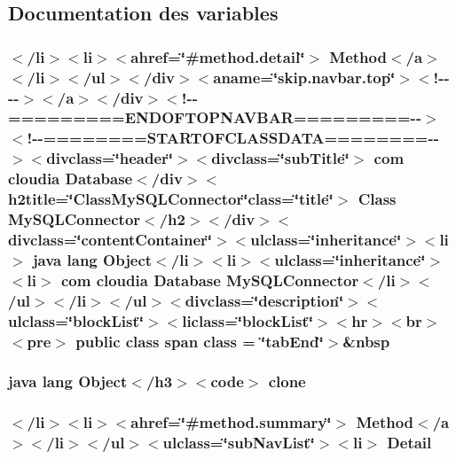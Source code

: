 \subsection{Documentation des variables}
\hypertarget{_my_s_q_l_connector_8html_a6073286361c565bca36f85919cc05c30}{
\subsubsection[{class}]{\setlength{\rightskip}{0pt plus 5cm}$<$/li$>$$<$li$>$$<$ahref=\char`\"{}\#method.\-detail\char`\"{}$>$ Method$<$/{\bf a}$>$$<$/li$>$$<$/ul$>$$<$/div$>$$<$aname=\char`\"{}skip.\-navbar.\-top\char`\"{}$>$$<$!-\/-\/-\/-\/$>$$<$/a$>$$<$/div$>$$<$!-\/-\/=========E\-N\-D\-O\-F\-T\-O\-P\-N\-A\-V\-B\-A\-R=========-\/-\/$>$$<$!-\/-\/========S\-T\-A\-R\-T\-O\-F\-C\-L\-A\-S\-S\-D\-A\-T\-A========-\/-\/$>$$<$divclass=\char`\"{}header\char`\"{}$>$$<$divclass=\char`\"{}sub\-Title\char`\"{}$>$ com cloudia Database$<$/div$>$$<$h2title=\char`\"{}Class\-My\-S\-Q\-L\-Connector\char`\"{}class=\char`\"{}title\char`\"{}$>$ Class {\bf My\-S\-Q\-L\-Connector}$<$/h2$>$$<$/div$>$$<$divclass=\char`\"{}content\-Container\char`\"{}$>$$<$ulclass=\char`\"{}inheritance\char`\"{}$>$$<$li$>$ java lang Object$<$/li$>$$<$li$>$$<$ulclass=\char`\"{}inheritance\char`\"{}$>$$<$li$>$ com cloudia Database {\bf My\-S\-Q\-L\-Connector}$<$/li$>$$<$/ul$>$$<$/li$>$$<$/ul$>$$<$divclass=\char`\"{}description\char`\"{}$>$$<$ulclass=\char`\"{}block\-List\char`\"{}$>$$<$liclass=\char`\"{}block\-List\char`\"{}$>$$<$hr$>$$<$br$>$$<$pre$>$ public class {\bf span} class = \char`\"{}tab\-End\char`\"{}$>$\&nbsp}}\label{_my_s_q_l_connector_8html_a6073286361c565bca36f85919cc05c30}
\hypertarget{_my_s_q_l_connector_8html_adc9607fcabf6f2d7f401ad52015ef6e0}{
\subsubsection[{clone}]{\setlength{\rightskip}{0pt plus 5cm}java lang Object$<$/h3$>$$<$code$>$ clone}}\label{_my_s_q_l_connector_8html_adc9607fcabf6f2d7f401ad52015ef6e0}
\hypertarget{_my_s_q_l_connector_8html_a1e04b5ec07bcd5281e26dcd40e5b3a94}{
\subsubsection[{Detail}]{\setlength{\rightskip}{0pt plus 5cm}$<$/li$>$$<$li$>$$<$ahref=\char`\"{}\#method.\-summary\char`\"{}$>$ Method$<$/{\bf a}$>$$<$/li$>$$<$/ul$>$$<$ulclass=\char`\"{}sub\-Nav\-List\char`\"{}$>$$<$li$>$ Detail}}\label{_my_s_q_l_connector_8html_a1e04b5ec07bcd5281e26dcd40e5b3a94}

